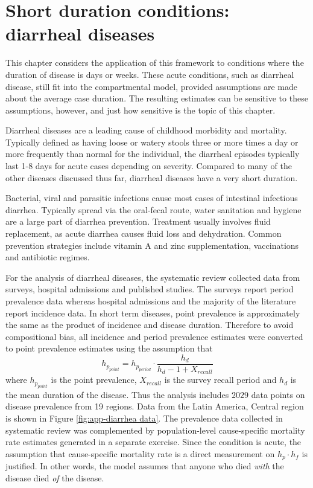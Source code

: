 \chapter{Short duration conditions: diarrheal diseases}
\label{applications-short_dur}

This chapter considers the application of this framework to
conditions where the duration of disease is days or weeks. These acute
conditions, such as diarrheal disease, still fit into the
compartmental model, provided assumptions are made about the average
case duration.  The resulting estimates can be sensitive to these
assumptions, however, and just how sensitive is the topic of this
chapter.

Diarrheal diseases are a leading cause of childhood morbidity and
mortality.  Typically defined as having loose or watery stools three
or more times a day or more frequently than normal for the individual,
the diarrheal episodes typically last 1-8 days for acute cases
depending on severity. \cite{unicef_diarrhoea_2009,
  carlos_etiology_1990, lamberti_systematic_2012} Compared to many of
the other diseases discussed thus far, diarrheal diseases have a very
short duration.

Bacterial, viral and parasitic infections cause most cases of
intestinal infectious diarrhea.  Typically spread via the oral-fecal
route, water sanitation and hygiene are a large part of diarrhea
prevention.  Treatment usually involves fluid replacement, as acute
diarrhea causes fluid loss and dehydration.  Common prevention
strategies include vitamin A and zinc supplementation, vaccinations
and antibiotic regimes. \cite{wardlaw_diarrhoea:_2010,
  carlos_etiology_1990, lamberti_systematic_2012}

For the analysis of diarrheal diseases, the systematic review collected data
from surveys, hospital admissions and published studies.  The
surveys report period prevalence data whereas hospital admissions and
the majority of the literature report incidence data.  In short term
diseases, point prevalence is approximately the same as the product of
incidence and disease duration.  Therefore to avoid compositional
bias, all incidence and period prevalence estimates were converted to
point prevalence estimates using the assumption that
    \begin{equation}
    	h_{p_{point}}=h_{p_{period}} \cdot
        \frac{h_{d}}{h_{d}-1+X_{recall}}
    \end{equation}
where $h_{p_{point}}$ is the point prevalence, $X_{recall}$ is the
survey recall period and $h_{d}$ is the mean duration of the disease.
Thus the analysis includes $2029$ data points on disease prevalence
from 19 regions.  Data from the Latin America, Central region is shown
in Figure \ref{fig:app-diarrhea data}.  The prevalence data collected
in systematic review was complemented by population-level
cause-specific mortality rate estimates generated in a separate
exercise.  Since the condition is acute, the assumption that
cause-specific mortality rate is a direct measurement on $h_{p}\cdot
h_f$ is justified.  In other words, the model assumes that anyone who
died \emph{with} the disease died \emph{of} the disease.


